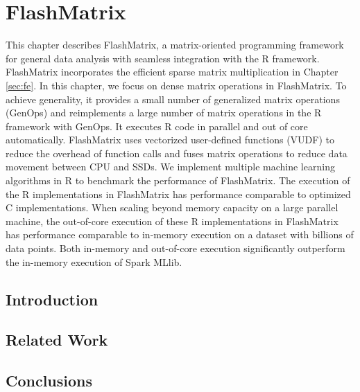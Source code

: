 \chapter{FlashMatrix}
\label{sec:fm}

This chapter describes FlashMatrix, a matrix-oriented programming framework
for general data analysis with seamless integration with the R framework.
FlashMatrix incorporates the efficient sparse matrix multiplication in Chapter
\ref{sec:fe}. In this chapter, we focus on dense matrix operations in FlashMatrix.
To achieve generality, it provides a small number of generalized matrix
operations (GenOps) and reimplements a large number of matrix operations in
the R framework with GenOps. It executes R code in parallel and out of
core automatically. FlashMatrix
uses vectorized user-defined functions (VUDF) to reduce the overhead of function
calls and fuses matrix operations to reduce data movement between CPU and
SSDs. We implement multiple machine learning algorithms in R to benchmark
the performance of FlashMatrix. The execution of the R implementations in
FlashMatrix has performance comparable to optimized C implementations.
When scaling beyond memory capacity on a large parallel machine, the out-of-core
execution of these R implementations in FlashMatrix has performance comparable
to in-memory execution on a dataset with billions of data points. Both in-memory
and out-of-core execution significantly outperform the in-memory execution of
Spark MLlib.

\section{Introduction}


\section{Related Work}






\section{Conclusions}

